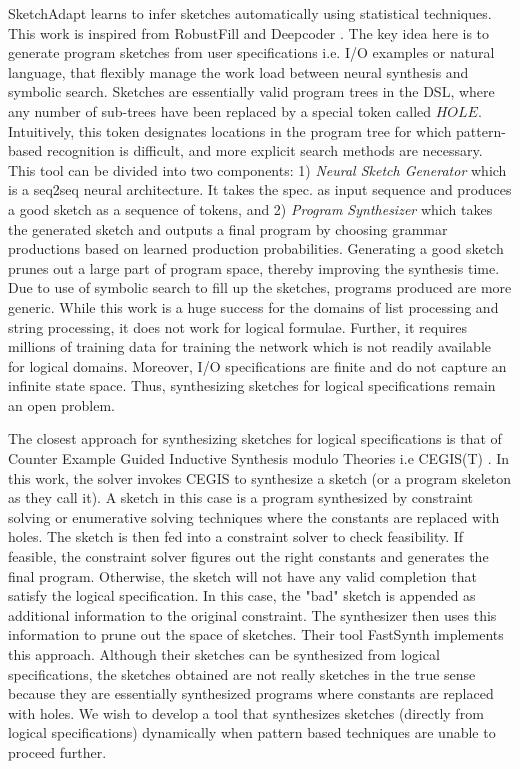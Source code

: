 SketchAdapt \cite{nye2019learning} learns to infer sketches automatically using statistical techniques. This work is inspired from RobustFill \cite{devlin2017robustfill} and Deepcoder \cite{balog2016deepcoder}.
The key idea here is to generate program sketches from user specifications i.e. I/O examples or natural language, that flexibly manage the work load between neural synthesis and symbolic search. Sketches are essentially valid program trees in the DSL, where any number of sub-trees have been replaced by a special token called $HOLE$. Intuitively, this token designates locations in the program tree for which pattern-based recognition is difficult, and more explicit search methods are necessary. This tool can be divided into two components: 1) \emph{Neural Sketch Generator} which is a seq2seq neural architecture. It takes the spec. as input sequence and produces a good sketch as a sequence of tokens, and 2) \emph{Program Synthesizer} which takes the generated sketch and outputs a final program by choosing grammar productions based on learned production probabilities. Generating a good sketch prunes out a large part of program space, thereby improving the synthesis time. Due to use of symbolic search to fill up the sketches, programs produced are more generic. While this work is a huge success for the domains of list processing and string processing, it does not work for logical formulae. Further, it requires millions of training data for training the network which is not readily available for logical domains. Moreover, I/O specifications are finite and do not capture an infinite state space. Thus, synthesizing sketches for logical specifications remain an open problem.

The closest approach for synthesizing sketches for logical specifications is that of Counter Example Guided Inductive Synthesis modulo Theories i.e CEGIS(T) \cite{abate2018counterexample}. In this work, the solver invokes CEGIS to synthesize a sketch (or a program skeleton as they call it). A sketch in this case is a program synthesized by constraint solving or enumerative solving techniques where the constants are replaced with holes. The sketch is then fed into a constraint solver to check feasibility. If feasible, the constraint solver figures out the right constants and generates the final program. Otherwise, the sketch will not have any valid completion that satisfy the logical specification. In this case, the "bad" sketch is appended as additional information to the original constraint. The synthesizer then uses this information to prune out the space of sketches. Their tool FastSynth implements this approach. Although their sketches can be synthesized from logical specifications, the sketches obtained are not really sketches in the true sense because they are essentially synthesized programs where constants are replaced with holes. We wish to develop a tool that synthesizes sketches (directly from logical specifications) dynamically when pattern based techniques are unable to proceed further.

